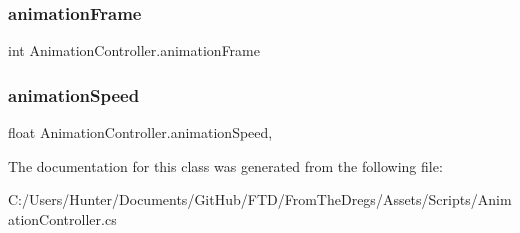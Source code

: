\subsubsection{\texorpdfstring{animationFrame}{animationFrame}}
{\footnotesize\ttfamily int Animation\+Controller.\+animation\+Frame\hspace{0.3cm}{\ttfamily [get]}}

\mbox{\label{class_animation_controller_a9a5d475137de1a9cb890396d404104a4}} 
\subsubsection{\texorpdfstring{animationSpeed}{animationSpeed}}
{\footnotesize\ttfamily float Animation\+Controller.\+animation\+Speed\hspace{0.3cm}{\ttfamily [get]}, {\ttfamily [set]}}



The documentation for this class was generated from the following file\+:\begin{DoxyCompactItemize}
\item 
C\+:/\+Users/\+Hunter/\+Documents/\+Git\+Hub/\+F\+T\+D/\+From\+The\+Dregs/\+Assets/\+Scripts/Animation\+Controller.\+cs\end{DoxyCompactItemize}
